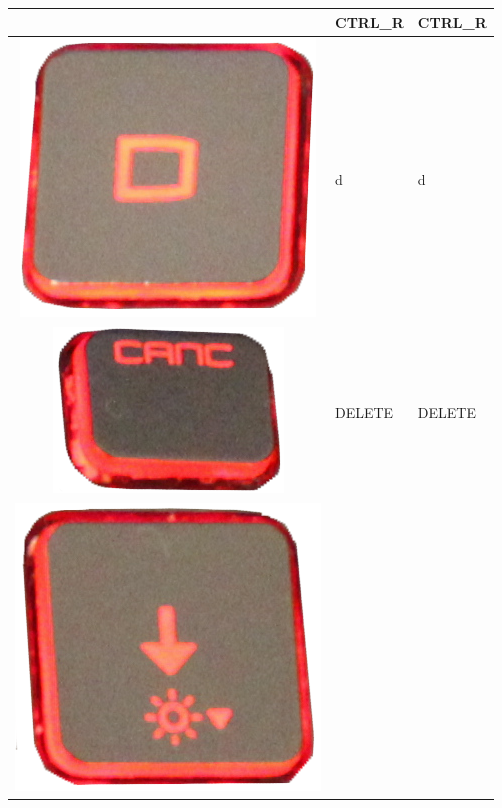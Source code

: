 \begin{longtable}{|cll|}
\begin{minipage}[c]{.4\textwidth}
\vspace{0.2cm}
\end{minipage} & CTRL\_R & CTRL\_R\\
\hline
\begin{minipage}[c]{.4\textwidth}
\vspace{0.2cm}
\includegraphics[scale=0.08]{Images/KeyMapping/d}
\vspace{0.2cm}
\end{minipage} & d & d\\
\hline
\begin{minipage}[c]{.4\textwidth}
\vspace{0.2cm}
\includegraphics[scale=0.08]{Images/KeyMapping/DELETE}
\vspace{0.2cm}
\end{minipage} & DELETE & DELETE\\
\hline
\begin{minipage}[c]{.4\textwidth}
\vspace{0.2cm}
\includegraphics[scale=0.08]{Images/KeyMapping/DOWN}

\end{minipage}
\end{longtable}
